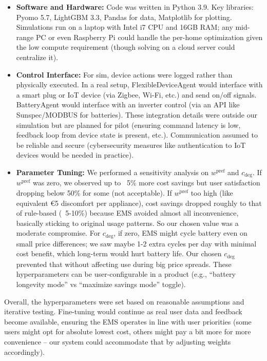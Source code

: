 \documentclass[12pt,a4paper]{article}
\begin{document}
\begin{itemize}
    \item \textbf{Software and Hardware:} Code was written in Python 3.9. Key libraries: Pyomo 5.7, LightGBM 3.3, Pandas for data, Matplotlib for plotting. Simulations run on a laptop with Intel i7 CPU and 16GB RAM; any mid-range PC or even Raspberry Pi could handle the per-home optimization given the low compute requirement (though solving on a cloud server could centralize it). 
    \item \textbf{Control Interface:} For sim, device actions were logged rather than physically executed. In a real setup, FlexibleDeviceAgent would interface with a smart plug or IoT device (via Zigbee, Wi-Fi, etc.) and send on/off signals. BatteryAgent would interface with an inverter control (via an API like Sunspec/MODBUS for batteries). These integration details were outside our simulation but are planned for pilot (ensuring command latency is low, feedback loop from device state is present, etc.). Communication assumed to be reliable and secure (cybersecurity measures like authentication to IoT devices would be needed in practice).
    \item \textbf{Parameter Tuning:} We performed a sensitivity analysis on $w^{\text{pref}}$ and $c_{\text{deg}}$. If $w^{\text{pref}}$ was zero, we observed up to ~5\% more cost savings but user satisfaction dropping below 50\% for some (not acceptable). If $w^{\text{pref}}$ too high (like equivalent €5 discomfort per appliance), cost savings dropped roughly to that of rule-based (~5-10\%) because EMS avoided almost all inconvenience, basically sticking to original usage patterns. So our chosen value was a moderate compromise. For $c_{\text{deg}}$, if zero, EMS might cycle battery even on small price differences; we saw maybe 1-2 extra cycles per day with minimal cost benefit, which long-term would hurt battery life. Our chosen $c_{\text{deg}}$ prevented that without affecting use during big price spreads. These hyperparameters can be user-configurable in a product (e.g., “battery longevity mode” vs “maximize savings mode” toggle).
\end{itemize}

Overall, the hyperparameters were set based on reasonable assumptions and iterative testing. Fine-tuning would continue as real user data and feedback become available, ensuring the EMS operates in line with user priorities (some users might opt for absolute lowest cost, others might pay a bit more for more convenience – our system could accommodate that by adjusting weights accordingly).

\clearpage
\printbibliography[title={References}]
\end{document}
